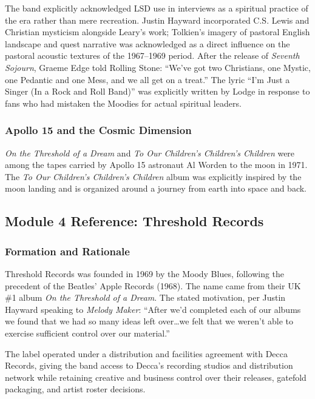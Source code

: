 \documentclass[11pt,letterpaper]{article}
\begin{document}
The band explicitly acknowledged LSD use in interviews as a spiritual practice of the era rather than mere recreation. Justin Hayward incorporated C.S. Lewis and Christian mysticism alongside Leary's work; Tolkien's imagery of pastoral English landscape and quest narrative was acknowledged as a direct influence on the pastoral acoustic textures of the 1967--1969 period. After the release of \textit{Seventh Sojourn}, Graeme Edge told Rolling Stone: ``We've got two Christians, one Mystic, one Pedantic and one Mess, and we all get on a treat.'' The lyric ``I'm Just a Singer (In a Rock and Roll Band)'' was explicitly written by Lodge in response to fans who had mistaken the Moodies for actual spiritual leaders.

\subsubsection{Apollo 15 and the Cosmic Dimension}

\textit{On the Threshold of a Dream} and \textit{To Our Children's Children's Children} were among the tapes carried by Apollo 15 astronaut Al Worden to the moon in 1971. The \textit{To Our Children's Children's Children} album was explicitly inspired by the moon landing and is organized around a journey from earth into space and back.

\subsection{Module 4 Reference: Threshold Records}

\subsubsection{Formation and Rationale}

Threshold Records was founded in 1969 by the Moody Blues, following the precedent of the Beatles' Apple Records (1968). The name came from their UK \#1 album \textit{On the Threshold of a Dream}. The stated motivation, per Justin Hayward speaking to \textit{Melody Maker}: ``After we'd completed each of our albums we found that we had so many ideas left over\ldots we felt that we weren't able to exercise sufficient control over our material.''

The label operated under a distribution and facilities agreement with Decca Records, giving the band access to Decca's recording studios and distribution network while retaining creative and business control over their releases, gatefold packaging, and artist roster decisions.
\end{document}
